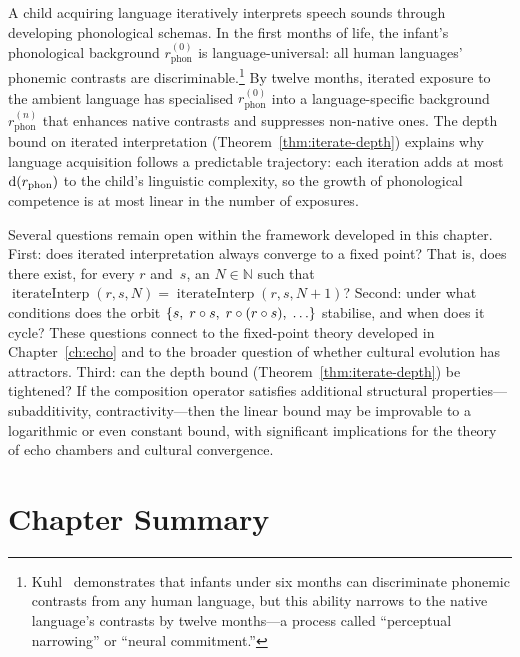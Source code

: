 \begin{example}
A child acquiring language iteratively interprets speech sounds through
developing phonological schemas.  In the first months of life, the
infant's phonological background $r_{\mathrm{phon}}^{(0)}$ is
language-universal: all human languages' phonemic contrasts are
discriminable.\footnote{Kuhl~\cite{kuhl2004} demonstrates that infants
under six months can discriminate phonemic contrasts from any human
language, but this ability narrows to the native language's contrasts by
twelve months---a process called ``perceptual narrowing'' or ``neural
commitment.''}  By twelve months, iterated exposure to the ambient
language has specialised $r_{\mathrm{phon}}^{(0)}$ into a
language-specific background $r_{\mathrm{phon}}^{(n)}$ that enhances
native contrasts and suppresses non-native ones.  The depth bound on
iterated interpretation (Theorem~\ref{thm:iterate-depth}) explains why
language acquisition follows a predictable trajectory: each iteration
adds at most $\operatorname{d}(r_{\mathrm{phon}})$ to the child's linguistic
complexity, so the growth of phonological competence is at most linear in
the number of exposures.
\end{example}

\begin{remark}
Several questions remain open within the framework developed in this
chapter.  First: does iterated interpretation always converge to a fixed
point?  That is, does there exist, for every $r$ and~$s$, an
$N \in \mathbb{N}$ such that
$\operatorname{iterateInterp}(r, s, N) = \operatorname{iterateInterp}(r, s, N+1)$?
Second: under what conditions does the orbit
$\{s,\; r \circ s,\; r \circ (r \circ s),\; \ldots\}$
stabilise, and when does it cycle?  These questions connect to the
fixed-point theory developed in Chapter~\ref{ch:echo} and to the
broader question of whether cultural evolution has attractors.  Third:
can the depth bound (Theorem~\ref{thm:iterate-depth}) be tightened?
If the composition operator satisfies additional structural
properties---subadditivity, contractivity---then the linear bound may be
improvable to a logarithmic or even constant bound, with significant
implications for the theory of echo chambers and cultural convergence.
\end{remark}

\section*{Chapter Summary}

